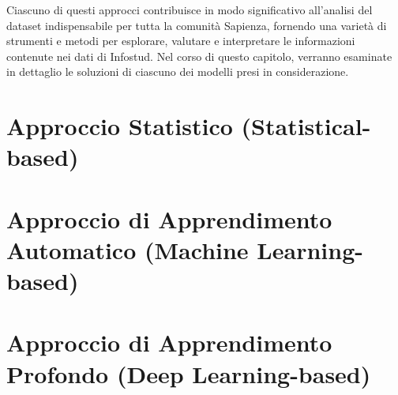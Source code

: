     Ciascuno di questi approcci contribuisce in modo significativo all'analisi del dataset indispensabile per tutta 
    la comunità Sapienza, fornendo una varietà di strumenti e metodi per esplorare, valutare e interpretare le 
    informazioni contenute nei dati di Infostud. Nel corso di questo capitolo, verranno esaminate in dettaglio 
    le soluzioni di ciascuno dei modelli presi in considerazione.

    \section{Approccio Statistico (Statistical-based)}
        

    \section{Approccio di Apprendimento Automatico (Machine Learning-based)}
        

    \section{Approccio di Apprendimento Profondo (Deep Learning-based)}
        
        